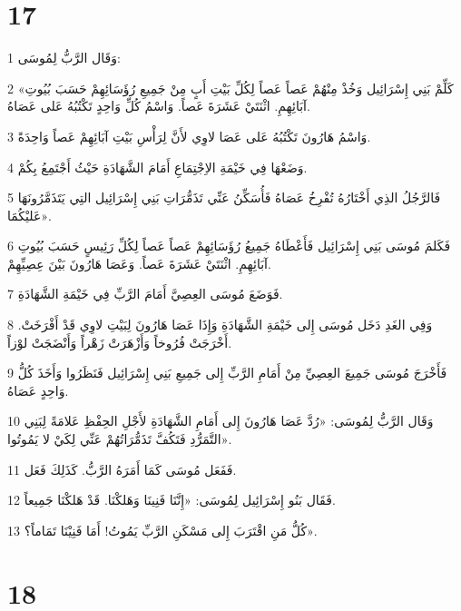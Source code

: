 \chapter{17}

\par 1 وَقَال الرَّبُّ لِمُوسَى:
\par 2 «كَلِّمْ بَنِي إِسْرَائِيل وَخُذْ مِنْهُمْ عَصاً عَصاً لِكُلِّ بَيْتِ أَبٍ مِنْ جَمِيعِ رُؤَسَائِهِمْ حَسَبَ بُيُوتِ آبَائِهِمِ. اثْنَتَيْ عَشَرَةَ عَصاً. وَاسْمُ كُلِّ وَاحِدٍ تَكْتُبُهُ عَلى عَصَاهُ.
\par 3 وَاسْمُ هَارُونَ تَكْتُبُهُ عَلى عَصَا لاوِي لأَنَّ لِرَأْسِ بَيْتِ آبَائِهِمْ عَصاً وَاحِدَةً.
\par 4 وَضَعْهَا فِي خَيْمَةِ الاِجْتِمَاعِ أَمَامَ الشَّهَادَةِ حَيْثُ أَجْتَمِعُ بِكُمْ.
\par 5 فَالرَّجُلُ الذِي أَخْتَارُهُ تُفْرِخُ عَصَاهُ فَأُسَكِّنُ عَنِّي تَذَمُّرَاتِ بَنِي إِسْرَائِيل التِي يَتَذَمَّرُونَهَا عَليْكُمَا».
\par 6 فَكَلمَ مُوسَى بَنِي إِسْرَائِيل فَأَعْطَاهُ جَمِيعُ رُؤَسَائِهِمْ عَصاً عَصاً لِكُلِّ رَئِيسٍ حَسَبَ بُيُوتِ آبَائِهِمِ. اثْنَتَيْ عَشَرَةَ عَصاً. وَعَصَا هَارُونَ بَيْنَ عِصِيِّهِمْ.
\par 7 فَوَضَعَ مُوسَى العِصِيَّ أَمَامَ الرَّبِّ فِي خَيْمَةِ الشَّهَادَةِ.
\par 8 وَفِي الغَدِ دَخَل مُوسَى إِلى خَيْمَةِ الشَّهَادَةِ وَإِذَا عَصَا هَارُونَ لِبَيْتِ لاوِي قَدْ أَفْرَخَتْ. أَخْرَجَتْ فُرُوخاً وَأَزْهَرَتْ زَهْراً وَأَنْضَجَتْ لوْزاً.
\par 9 فَأَخْرَجَ مُوسَى جَمِيعَ العِصِيِّ مِنْ أَمَامِ الرَّبِّ إِلى جَمِيعِ بَنِي إِسْرَائِيل فَنَظَرُوا وَأَخَذَ كُلُّ وَاحِدٍ عَصَاهُ.
\par 10 وَقَال الرَّبُّ لِمُوسَى: «رُدَّ عَصَا هَارُونَ إِلى أَمَامِ الشَّهَادَةِ لأَجْلِ الحِفْظِ عَلامَةً لِبَنِي التَّمَرُّدِ فَتَكُفَّ تَذَمُّرَاتُهُمْ عَنِّي لِكَيْ لا يَمُوتُوا».
\par 11 فَفَعَل مُوسَى كَمَا أَمَرَهُ الرَّبُّ. كَذَلِكَ فَعَل.
\par 12 فَقَال بَنُو إِسْرَائِيل لِمُوسَى: «إِنَّنَا فَنِينَا وَهَلكْنَا. قَدْ هَلكْنَا جَمِيعاً.
\par 13 كُلُّ مَنِ اقْتَرَبَ إِلى مَسْكَنِ الرَّبِّ يَمُوتُ! أَمَا فَنِيْنَا تَمَاماً؟».

\chapter{18}

